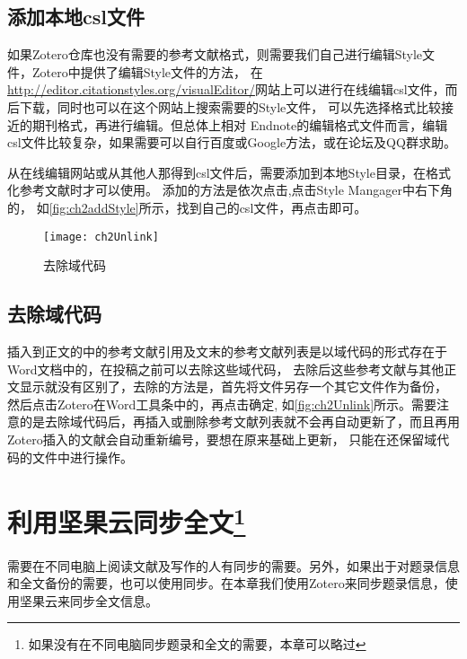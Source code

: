 \documentclass[cn,11pt,chinese]{elegantbook}
\begin{document}
		\section{添加本地csl文件}\label{sec:addStyle}
				如果Zotero仓库也没有需要的参考文献格式，则需要我们自己进行编辑Style文件，Zotero中提供了编辑Style文件的方法，
				在\url{http://editor.citationstyles.org/visualEditor/}网站上可以进行在线编辑csl文件，而后下载，同时也可以在这个网站上搜索需要的Style文件，
				可以先选择格式比较接近的期刊格式，再进行编辑。但总体上相对 Endnote的编辑格式文件而言，编辑csl文件比较复杂，如果需要可以自行百度或Google方法，或在论坛及QQ群求助。
			
				从在线编辑网站或从其他人那得到csl文件后，需要添加到本地Style目录，在格式化参考文献时才可以使用。
				添加的方法是依次点击,点击Style Mangager中右下角的\menu{+}，
				如\autoref{fig:ch2addStyle}所示，找到自己的csl文件，再点击即可。
				\begin{figure}[htbp]
					\centering
					\texttt{[image: ch2Unlink]}
					\caption{去除域代码}
					\label{fig:ch2Unlink}
				\end{figure}
		
		\section{去除域代码}
			插入到正文的中的参考文献引用及文末的参考文献列表是以域代码的形式存在于Word文档中的，在投稿之前可以去除这些域代码，
			去除后这些参考文献与其他正文显示就没有区别了，去除的方法是，首先将文件另存一个其它文件作为备份，
			然后点击Zotero在Word工具条中的，再点击确定,
			如\autoref{fig:ch2Unlink}所示。需要注意的是去除域代码后，再插入或删除参考文献列表就不会再自动更新了，而且再用Zotero插入的文献会自动重新编号，要想在原来基础上更新，
			只能在还保留域代码的文件中进行操作。
			
	\chapter[利用坚果云同步全文]{利用坚果云同步全文\footnote{如果没有在不同电脑同步题录和全文的需要，本章可以略过}}\label{ch:syn}		
		需要在不同电脑上阅读文献及写作的人有同步的需要。另外，如果出于对题录信息和全文备份的需要，也可以使用同步。在本章我们使用Zotero来同步题录信息，使用坚果云来同步全文信息。
\end{document}
